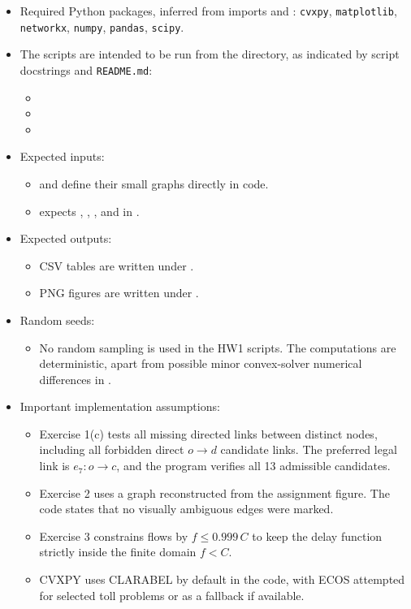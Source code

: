 \documentclass[11pt,a4paper]{article}
\begin{document}
\begin{itemize}
    \item Required Python packages, inferred from imports and : \texttt{cvxpy}, \texttt{matplotlib}, \texttt{networkx}, \texttt{numpy}, \texttt{pandas}, \texttt{scipy}.
    \item The scripts are intended to be run from the  directory, as indicated by script docstrings and \texttt{README.md}:
    \begin{itemize}
        \item {}
        \item {}
        \item {}
    \end{itemize}
    \item Expected inputs:
    \begin{itemize}
        \item {} and  define their small graphs directly in code.
        \item {} expects , , , and  in .
    \end{itemize}
    \item Expected outputs:
    \begin{itemize}
        \item CSV tables are written under .
        \item PNG figures are written under .
    \end{itemize}
    \item Random seeds:
    \begin{itemize}
        \item No random sampling is used in the HW1 scripts. The computations are deterministic, apart from possible minor convex-solver numerical differences in .
    \end{itemize}
    \item Important implementation assumptions:
    \begin{itemize}
        \item Exercise 1(c) tests all missing directed links between distinct nodes, including all forbidden direct $o\to d$ candidate links. The preferred legal link is $e_7:o\to c$, and the program verifies all 13 admissible candidates.
        \item Exercise 2 uses a graph reconstructed from the assignment figure. The code states that no visually ambiguous edges were marked.
        \item Exercise 3 constrains flows by $f\leq 0.999\,C$ to keep the delay function strictly inside the finite domain $f<C$.
        \item CVXPY uses CLARABEL by default in the code, with ECOS attempted for selected toll problems or as a fallback if available.
    \end{itemize}
\end{itemize}
\end{document}
